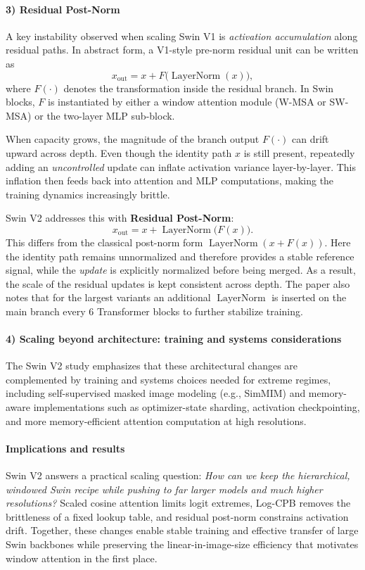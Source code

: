 \paragraph{3) Residual Post-Norm}
\noindent
A key instability observed when scaling Swin V1 is \emph{activation accumulation} along residual paths.
In abstract form, a V1-style pre-norm residual unit can be written as
\[
x_{\text{out}} = x + F\!\bigl(\operatorname{LayerNorm}(x)\bigr),
\]
where \(F(\cdot)\) denotes the transformation inside the residual branch.
In Swin blocks, \(F\) is instantiated by either a window attention module (W-MSA or SW-MSA) or the
two-layer MLP sub-block.

\noindent
When capacity grows, the magnitude of the branch output \(F(\cdot)\) can drift upward across depth.
Even though the identity path \(x\) is still present, repeatedly adding an \emph{uncontrolled} update can
inflate activation variance layer-by-layer.
This inflation then feeds back into attention and MLP computations, making the training dynamics
increasingly brittle.

\noindent
Swin V2 addresses this with \textbf{Residual Post-Norm}:
\[
x_{\text{out}} = x + \operatorname{LayerNorm}\!\bigl(F(x)\bigr).
\]
This differs from the classical post-norm form \(\operatorname{LayerNorm}(x+F(x))\).
Here the identity path remains unnormalized and therefore provides a stable reference signal, while the
\emph{update} is explicitly normalized before being merged.
As a result, the scale of the residual updates is kept consistent across depth.
The paper also notes that for the largest variants an additional \(\operatorname{LayerNorm}\) is inserted
on the main branch every 6 Transformer blocks to further stabilize training.

\paragraph{4) Scaling beyond architecture: training and systems considerations}
\noindent
The Swin V2 study emphasizes that these architectural changes are complemented by training and systems
choices needed for extreme regimes, including self-supervised masked image modeling (e.g., SimMIM) and
memory-aware implementations such as optimizer-state sharding, activation checkpointing, and more
memory-efficient attention computation at high resolutions.

\paragraph{Implications and results}
\noindent
Swin V2 answers a practical scaling question:
\emph{How can we keep the hierarchical, windowed Swin recipe while pushing to far larger models and much higher resolutions?}
Scaled cosine attention limits logit extremes, Log-CPB removes the brittleness of a fixed lookup table,
and residual post-norm constrains activation drift.
Together, these changes enable stable training and effective transfer of large Swin backbones while
preserving the linear-in-image-size efficiency that motivates window attention in the first place. 

